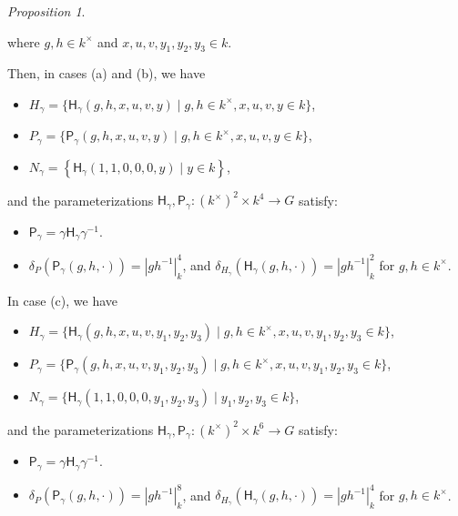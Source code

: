 \documentclass[12pt]{amsart}
\newcommand{\absk}[1]{\left\lvert#1\right\rvert_k}
\theoremstyle{Theorem}
\theoremstyle{Theorem}
\theoremstyle{Theorem}
\theoremstyle{Theorem}
\theoremstyle{Plain}
\theoremstyle{remark}
\theoremstyle{remark}
\theoremstyle{Definition}
\newtheorem{prpd}[dfn]{Proposition}
\begin{document}
\begin{prpd}
\begin{itemize}
        where $ g, h \in k^\times $ and $ x, u, v, y_1, y_2, y_3 \in k $.
    \end{itemize}
    Then, in cases {\rm (a)} and {\rm (b)}, we have
    \begin{itemize}
        \item $ H_\gamma = \{ \mathsf{H}_\gamma ( g, h, x, u, v, y ) \mid g, h \in  k^\times, x, u, v, y \in k \} $,
        \item $ P_\gamma = \{ \mathsf{P}_\gamma ( g, h, x, u, v, y ) \mid g, h \in  k^\times, x, u, v, y \in k \} $,
        \item $ N_\gamma = \left\{ \mathsf{H}_\gamma (1, 1, 0, 0, 0, y ) \mid y \in k \right\} $,
    \end{itemize}
    and the parameterizations $ \mathsf{H}_\gamma, \mathsf{P}_\gamma: (k^\times)^2 \times  k^4 \rightarrow G $ satisfy:
    \begin{itemize}
        \item $ \mathsf{P}_\gamma = \gamma \mathsf{H}_\gamma \gamma^{-1} $.
        \item $ \delta_P ( \mathsf{P}_\gamma ( g, h, \cdot ) ) = \absk{ g h^{-1} }^{4} $, and $ \delta_{ H_\gamma } ( \mathsf{H}_\gamma ( g, h, \cdot ) ) = \absk{ g h^{-1} }^2 $ for $ g, h \in k^\times $.
    \end{itemize}
    In case {\rm (c)}, we have 
    \begin{itemize}
        \item $ H_\gamma = \{ \mathsf{H}_\gamma ( g, h, x, u, v, y_1, y_2, y_3 ) \mid g, h \in k^\times, x, u, v, y_1, y_2, y_3 \in k \} $,
        \item $ P_\gamma = \{ \mathsf{P}_\gamma ( g, h, x, u, v, y_1, y_2 ,y_3 ) \mid g, h \in k^\times, x, u, v, y_1, y_2, y_3 \in k \} $,
        \item $ N_\gamma = \{ \mathsf{H}_\gamma ( 1, 1, 0, 0, 0, y_1, y_2, y_3 ) \mid y_1, y_2, y_3 \in k \} $,
    \end{itemize}
    and the parameterizations $ \mathsf{H}_\gamma , \mathsf{P}_\gamma: (k^\times)^2 \times  k^6 \rightarrow G $ satisfy:
    \begin{itemize}
        \item $ \mathsf{P}_\gamma = \gamma \mathsf{H}_\gamma \gamma^{-1} $.
        \item $ \delta_P ( \mathsf{P}_\gamma (g, h, \cdot ) ) = \absk{ g h^{-1} }^8 $, and $ \delta_{ H_\gamma } ( \mathsf{H}_\gamma ( g, h, \cdot ) ) = \absk{ g h^{-1} }^4$ for $ g, h \in k^\times $.
    \end{itemize}
\end{prpd}
\end{document}
